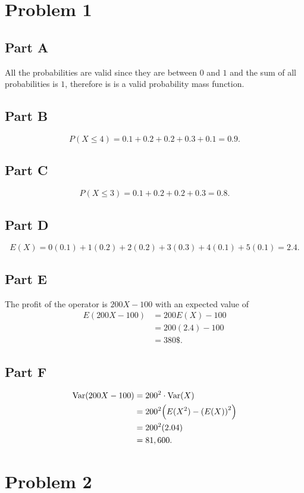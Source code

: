 \documentclass[12pt]{extarticle}
\begin{document}
\section*{Problem 1}
\subsection*{Part A}
All the probabilities are valid since they are between $0$ and $1$ and the sum of all probabilities is $1$, therefore is is a valid probability mass function.

\subsection*{Part B}
\[
	P(X \leq 4) = 0.1 + 0.2 + 0.2 + 0.3 + 0.1 = 0.9
.\]

\subsection*{Part C}
\[
	P(X \leq 3) = 0.1 + 0.2 + 0.2 + 0.3 = 0.8
.\]

\subsection*{Part D}
\[
	E(X) = 0(0.1) + 1(0.2) + 2(0.2) + 3(0.3) + 4(0.1) + 5(0.1) = 2.4
.\]

\subsection*{Part E}
The profit of the operator is $200 X - 100$ with an expected value of
\begin{align*}
	E(200 X - 100) &= 200 E(X) - 100 \\
								 &= 200 (2.4) - 100 \\
								 &= 380\$
.\end{align*}

\subsection*{Part F}
\begin{align*}
	\text{Var}(200 X - 100) &= 200^2 \cdot \text{Var}(X) \\
		&= 200^2 \qty(E(X^2) - \qty(E(X))^2) \\
		&= 200^2 \qty(2.04) \\
		&= 81,600
.\end{align*}

\section*{Problem 2}
\end{document}
